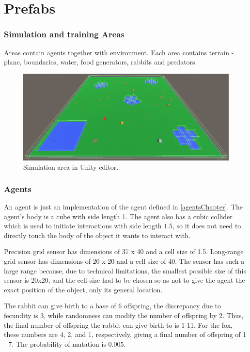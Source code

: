\section{Prefabs}
\subsubsection{Simulation and training Areas}
Areas contain agents together with environment. Each area contains terrain - plane, boundaries, water, food generators, rabbits and predators.

\begin{figure}
    \centering
    \includegraphics[width=\textwidth]{Images/simulation_area.png}
    \caption{Simulation area in Unity editor.}
    \label{fig:simulationArea}
\end{figure}

\subsubsection{Agents}
An agent is just an implementation of the agent defined in \autoref{agentsChapter}. 
The agent's body is a cube with side length 1. The agent also has a cubic collider which is used to initiate interactions with side length $1.5$, so it does not need to directly touch the body of the object it wants to interact with. 

Precision grid sensor has dimensions of 37 x 40 and a cell size of 1.5. Long-range grid sensor has dimensions of 20 x 20 and a cell size of $40$. The sensor has such a large range because, due to technical limitations, the smallest possible size of this sensor is 20x20, and the cell size had to be chosen so as not to give the agent the exact position of the object, only its general location.

The rabbit can give birth to a base of 6 offspring, the discrepancy due to fecundity is 3, while randomness can modify the number of offspring by 2. Thus, the final number of offspring the rabbit can give birth to is 1-11. For the fox, these numbers are 4, 2, and 1, respectively, giving a final number of offspring of 1 - 7. The probability of mutation is 0.005.

